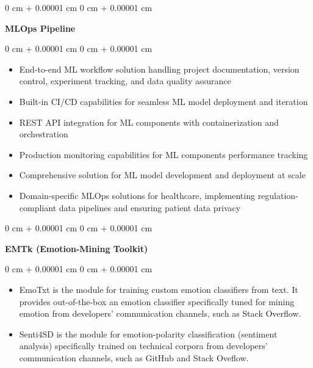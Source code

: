 \documentclass[10pt, a4paper]{article}
\newenvironment{highlights}{
    \begin{itemize}[
        topsep=0.10 cm,
        parsep=0.10 cm,
        partopsep=0pt,
        itemsep=0pt,
        leftmargin=0 cm + 10pt
    ]
}{
    \end{itemize}
} %
\newenvironment{onecolentry}{
    \begin{adjustwidth}{
        0 cm + 0.00001 cm
    }{
        0 cm + 0.00001 cm
    }
}{
    \end{adjustwidth}
} %
\newenvironment{twocolentry}[2][]{
    \onecolentry
    \def\secondColumn{#2}
    \setcolumnwidth{\fill, 4.5 cm}
    \begin{paracol}{2}
}{
    \switchcolumn \raggedleft \secondColumn
    \end{paracol}
    \endonecolentry
} %
\let\hrefWithoutArrow\href
\renewcommand{\href}[2]{\hrefWithoutArrow{#1}{\ifthenelse{\equal{#2}{}}{ }{#2 }\raisebox{.15ex}{\footnotesize \faExternalLink*}}}
\begin{document}
        \vspace{0.2 cm}

        \begin{onecolentry}
            \textbf{MLOps Pipeline}\end{onecolentry}

        \vspace{0.10 cm}
        \begin{onecolentry}
            \begin{highlights}
                \item End-to-end ML workflow solution handling project documentation, version control, experiment tracking, and data quality assurance
                \item Built-in CI/CD capabilities for seamless ML model deployment and iteration
                \item REST API integration for ML components with containerization and orchestration
                \item Production monitoring capabilities for ML components performance tracking
                \item Comprehensive solution for ML model development and deployment at scale
                \item Domain-specific MLOps solutions for healthcare, implementing regulation-compliant data pipelines and ensuring patient data privacy
            \end{highlights}
        \end{onecolentry}


        \vspace{0.2 cm}

        \begin{twocolentry}{
            \href{https://github.com/collab-uniba/EMTk}{EMTk on GitHub}
        }
            \textbf{EMTk (Emotion-Mining Toolkit)}\end{twocolentry}

        \vspace{0.10 cm}
        \begin{onecolentry}
            \begin{highlights}
                \item EmoTxt is the module for training custom emotion classifiers from text. It provides out-of-the-box an emotion classifier specifically tuned for mining emotion from developers' communication channels, such as Stack Overflow.
                \item Senti4SD is the module for emotion-polarity classification (sentiment analysis) specifically trained on technical corpora from developers' communication channels, such as GitHub and Stack Oveflow.
            \end{highlights}
        \end{onecolentry}
\end{document}
